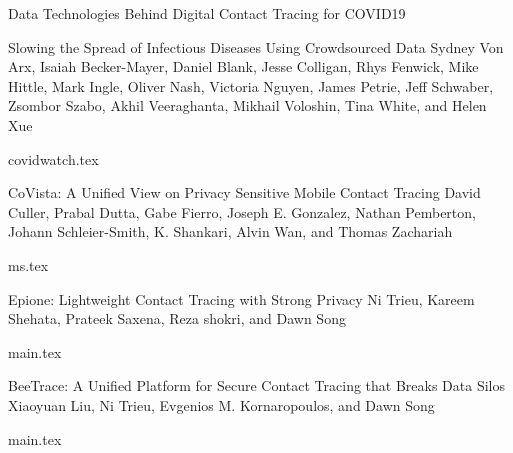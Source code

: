 \documentclass[11pt]{article}
\begin{document}
\begin{bulletin}
\begin{articlesection}{Data Technologies Behind Digital Contact Tracing for COVID19}
\makeatletter
\renewcommand{\AB@affillist}{}
\renewcommand{\AB@authlist}{}
\setcounter{authors}{0}
\makeatother

\begin{article}
{Slowing the Spread of Infectious Diseases Using Crowdsourced Data}
{Sydney Von Arx, Isaiah Becker-Mayer, Daniel Blank, Jesse Colligan, Rhys Fenwick, Mike Hittle, Mark Ingle, Oliver Nash, Victoria Nguyen, James Petrie, Jeff Schwaber, Zsombor Szabo, Akhil Veeraghanta, Mikhail Voloshin, Tina White, and Helen Xue}
\graphicspath{{submissions/covidwatch/}}
{covidwatch.tex}
\end{article}


\makeatletter
\renewcommand{\AB@affillist}{}
\renewcommand{\AB@authlist}{}
\setcounter{authors}{0}
\makeatother

\begin{article}
{CoVista: A Unified View on Privacy Sensitive Mobile Contact Tracing}
{David Culler, Prabal Dutta, Gabe Fierro, Joseph E. Gonzalez, Nathan Pemberton, Johann Schleier-Smith, K. Shankari, Alvin Wan, and Thomas Zachariah}
\graphicspath{{submissions/BerkeleyCovista/figs/}}
{ms.tex}
\end{article}


\makeatletter
\renewcommand{\AB@affillist}{}
\renewcommand{\AB@authlist}{}
\setcounter{authors}{0}
\makeatother

\begin{article}
{Epione: Lightweight  Contact Tracing with Strong Privacy}
{Ni Trieu, Kareem Shehata, Prateek Saxena, Reza shokri, and Dawn Song}
\graphicspath{{submissions/Epione/figs/}}
{main.tex}
\end{article}


\makeatletter
\renewcommand{\AB@affillist}{}
\renewcommand{\AB@authlist}{}
\setcounter{authors}{0}
\makeatother

\begin{article}
{BeeTrace: A Unified Platform for Secure Contact Tracing that Breaks Data Silos}
{Xiaoyuan Liu, Ni Trieu, Evgenios M. Kornaropoulos, and Dawn Song}
\graphicspath{{submissions/BeeTrace/figs/}}
{main.tex}
\end{article}




\end{articlesection}
\end{bulletin}
\end{document}
